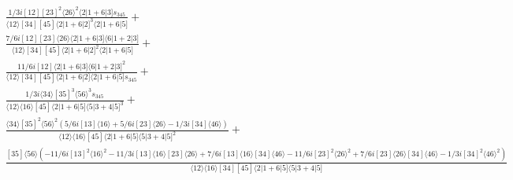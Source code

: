 \documentclass[varwidth, border=5pt]{standalone}
\begin{document}
\begin{my}
$\begin{gathered}
\scriptscriptstyle\frac{1/3i[12][23]^2⟨26⟩^2⟨2|1+6|3]s_{345}}{⟨12⟩[34][45]⟨2|1+6|2]^3⟨2|1+6|5]}+\\
\scriptscriptstyle\frac{7/6i[12][23]⟨26⟩⟨2|1+6|3]⟨6|1+2|3]}{⟨12⟩[34][45]⟨2|1+6|2]^2⟨2|1+6|5]}+\\
\scriptscriptstyle\frac{11/6i[12]⟨2|1+6|3]⟨6|1+2|3]^2}{⟨12⟩[34][45]⟨2|1+6|2]⟨2|1+6|5]s_{345}}+\\
\scriptscriptstyle\frac{1/3i⟨34⟩[35]^3⟨56⟩^3s_{345}}{⟨12⟩⟨16⟩[45]⟨2|1+6|5]⟨5|3+4|5]^3}+\\
\scriptscriptstyle\frac{⟨34⟩[35]^2⟨56⟩^2(5/6i[13]⟨16⟩+5/6i[23]⟨26⟩-1/3i[34]⟨46⟩)}{⟨12⟩⟨16⟩[45]⟨2|1+6|5]⟨5|3+4|5]^2}+\\
\scriptscriptstyle\frac{[35]⟨56⟩(-11/6i[13]^2⟨16⟩^2-11/3i[13]⟨16⟩[23]⟨26⟩+7/6i[13]⟨16⟩[34]⟨46⟩-11/6i[23]^2⟨26⟩^2+7/6i[23]⟨26⟩[34]⟨46⟩-1/3i[34]^2⟨46⟩^2)}{⟨12⟩⟨16⟩[34][45]⟨2|1+6|5]⟨5|3+4|5]}\phantom{+}
\end{gathered}$
\end{my}
\end{document}
